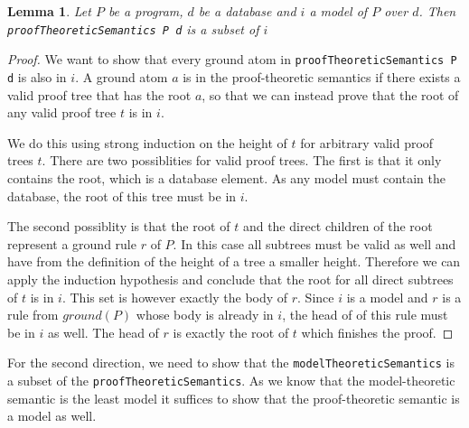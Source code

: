 \documentclass{article}
\newtheorem{lemma}{Lemma}
\begin{document}
        \begin{lemma}
            Let $P$ be a program, $d$ be a database and $i$ a model of $P$ over $d$. 
            Then \texttt{proofTheoreticSemantics P d} is a subset of $i$
        \end{lemma}
        \begin{proof}
            We want to show that every ground atom in \texttt{proofTheoreticSemantics P d} is also in $i$. A ground atom $a$ is in the proof-theoretic semantics if there exists a valid proof tree that has the root $a$, so that we can instead prove that the root of any valid proof tree $t$ is in $i$.

            We do this using strong induction on the height of $t$ for arbitrary valid proof trees $t$.
            There are two possiblities for valid proof trees. The first is that it only contains the root, which is a database element. As any model must contain the database, the root of this tree must be in $i$.

            The second possiblity is that the root of $t$ and the direct children of the root represent a ground rule $r$ of $P$. In this case all subtrees must be valid as well and have from the definition of the height of a tree a smaller height. Therefore we can apply the induction hypothesis and conclude that the root for all direct subtrees of $t$ is in $i$. This set is however exactly the body of $r$. Since $i$ is a model and $r$ is a rule from $ground(P)$ whose body is already in $i$, the head of of this rule must be in $i$ as well. The head of $r$ is exactly the root of $t$ which finishes the proof.
        \end{proof}

        For the second direction, we need to show that the \texttt{modelTheoreticSemantics} is a subset of the \texttt{proofTheoreticSemantics}. As we know that the model-theoretic semantic is the least model it suffices to show that the proof-theoretic semantic is a model as well.
\end{document}

